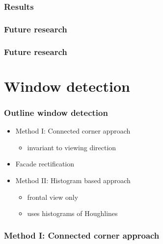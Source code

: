 \documentclass{beamer}
\begin{document}
\frame
{
	\frametitle{Results}
}


\frame
{
	\frametitle{Future research}
}

\frame
{
	\frametitle{Future research}
}


\section{Window detection}
\frame
{
}

\frame
{
	\frametitle{Outline window detection}
	\begin{itemize}
	\item Method I: Connected corner approach 
		\begin{itemize}
		\item invariant to viewing direction
		\end{itemize}
	\item Facade rectification 
	\item Method II: Histogram based approach
		\begin{itemize}
		\item frontal view only
		\item uses histograms of Houghlines
		\end{itemize}
	\end{itemize}
}

\frame
{
	\frametitle{Method I: Connected corner approach}
}
\end{document}
